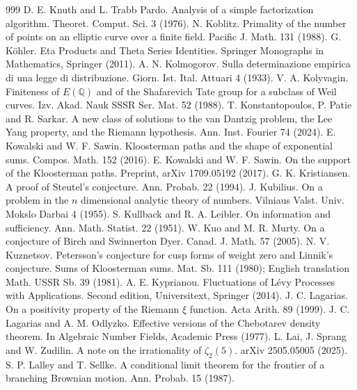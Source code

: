 \begin{thebibliography}{999}
 D. E. Knuth and L. Trabb Pardo. Analysis of a simple factorization algorithm. Theoret. Comput. Sci. 3 (1976).
 N. Koblitz. Primality of the number of points on an elliptic curve over a finite field. Pacific J. Math. 131 (1988).
 G. K\"ohler. Eta Products and Theta Series Identities. Springer Monographs in Mathematics, Springer (2011).
 A. N. Kolmogorov. Sulla determinazione empirica di una legge di distribuzione. Giorn. Ist. Ital. Attuari 4 (1933).
 V. A. Kolyvagin. Finiteness of $E(\mathbb{Q})$ and of the Shafarevich Tate group for a subclass of Weil curves. Izv. Akad. Nauk SSSR Ser. Mat. 52 (1988).
 T. Konstantopoulos, P. Patie and R. Sarkar. A new class of solutions to the van Dantzig problem, the Lee Yang property, and the Riemann hypothesis. Ann. Inst. Fourier 74 (2024).
 E. Kowalski and W. F. Sawin. Kloosterman paths and the shape of exponential sums. Compos. Math. 152 (2016).
 E. Kowalski and W. F. Sawin. On the support of the Kloosterman paths. Preprint, arXiv 1709.05192 (2017).
 G. K. Kristiansen. A proof of Steutel's conjecture. Ann. Probab. 22 (1994).
 J. Kubilius. On a problem in the $n$ dimensional analytic theory of numbers. Vilniaus Valst. Univ. Mokslo Darbai 4 (1955).
 S. Kullback and R. A. Leibler. On information and sufficiency. Ann. Math. Statist. 22 (1951).
 W. Kuo and M. R. Murty. On a conjecture of Birch and Swinnerton Dyer. Canad. J. Math. 57 (2005).
 N. V. Kuznetsov. Petersson's conjecture for cusp forms of weight zero and Linnik's conjecture. Sums of Kloosterman sums. Mat. Sb. 111 (1980); English translation Math. USSR Sb. 39 (1981).
 A. E. Kyprianou. Fluctuations of L\'evy Processes with Applications. Second edition, Universitext, Springer (2014).
 J. C. Lagarias. On a positivity property of the Riemann $\xi$ function. Acta Arith. 89 (1999).
 J. C. Lagarias and A. M. Odlyzko. Effective versions of the Chebotarev density theorem. In Algebraic Number Fields, Academic Press (1977).
 L. Lai, J. Sprang and W. Zudilin. A note on the irrationality of $\zeta_2(5)$. arXiv 2505.05005 (2025).
 S. P. Lalley and T. Sellke. A conditional limit theorem for the frontier of a branching Brownian motion. Ann. Probab. 15 (1987).

\end{thebibliography}
